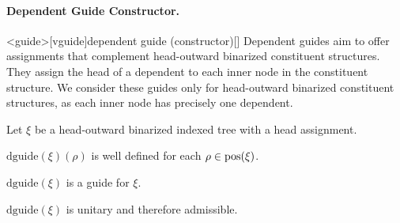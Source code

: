 \documentclass[../../document.tex]{subfiles}
\begin{document}
    \paragraph{Dependent Guide Constructor.}<guide>[vguide]{dependent guide (constructor)}[]
    Dependent guides aim to offer assignments that complement head-outward binarized constituent structures.
    They assign the head of a dependent to each inner node in the constituent structure.
    We consider these guides only for head-outward binarized constituent structures, as each inner node has precisely one dependent.

    \begin{claim}
        Let \(\xi\) be a head-outward binarized indexed tree with a head assignment.
        \begin{compactenum}
            \item \(\mathrm{dguide}(\xi)(\rho)\) is well defined for each \(\rho \in \operatorname{pos}(\xi)\).
            \item \(\mathrm{dguide}(\xi)\) is a guide for \(\xi\).
            \item \(\mathrm{dguide}(\xi)\) is unitary and therefore admissible.
        \end{compactenum}
    \end{claim}
\end{document}
